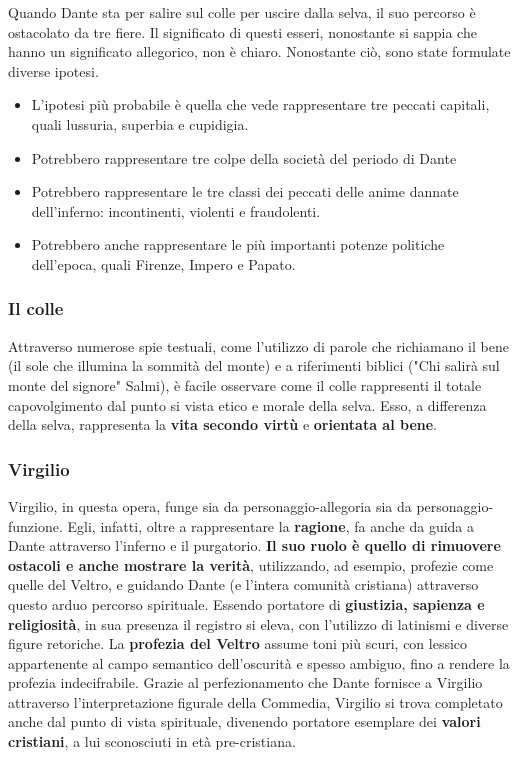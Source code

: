 \documentclass[10pt,a4paper]{article}
\begin{document}
 		Quando Dante sta per salire sul colle per uscire dalla selva, il suo percorso è ostacolato da tre fiere. Il significato di questi esseri, nonostante si sappia che hanno un significato allegorico, non è chiaro. Nonostante ciò, sono state formulate diverse ipotesi. 
 		\begin{itemize}
 			\item L'ipotesi più probabile è quella che vede rappresentare tre peccati capitali, quali lussuria, superbia e cupidigia.
 			\item Potrebbero rappresentare tre colpe della società del periodo di Dante
 			\item Potrebbero rappresentare le tre classi dei peccati delle anime dannate dell'inferno: incontinenti, violenti e fraudolenti.
 			\item Potrebbero anche rappresentare le più importanti potenze politiche dell'epoca, quali Firenze, Impero e Papato.  
 		\end{itemize}
 	
 		\subsubsection{Il colle}
 		
 		Attraverso numerose spie testuali, come l'utilizzo di parole che richiamano il bene (il sole che illumina la sommità del monte) e a riferimenti biblici ("Chi salirà sul monte del signore" Salmi), è facile osservare come il colle rappresenti il totale capovolgimento dal punto si vista etico e morale della selva. Esso, a differenza della selva, rappresenta la \textbf{vita secondo virtù} e \textbf{orientata al bene}.
 		
 		\subsubsection{Virgilio}
 		
		Virgilio, in questa opera, funge sia da personaggio-allegoria sia da personaggio-funzione. Egli, infatti, oltre a rappresentare la \textbf{ragione}, fa anche da guida a Dante attraverso l'inferno e il purgatorio. \textbf{Il suo ruolo è quello di rimuovere ostacoli e anche mostrare la verità}, utilizzando, ad esempio, profezie come quelle del Veltro, e guidando Dante (e l'intera comunità cristiana) attraverso questo arduo percorso spirituale. Essendo portatore di \textbf{giustizia, sapienza e religiosità}, in sua presenza il registro si eleva, con l'utilizzo di latinismi e diverse figure retoriche. La \textbf{profezia del Veltro} assume toni più scuri, con lessico appartenente al campo semantico dell'oscurità e spesso ambiguo, fino a rendere la profezia indecifrabile. Grazie al perfezionamento che Dante fornisce a Virgilio attraverso l'interpretazione figurale della Commedia, Virgilio si trova completato anche dal punto di vista spirituale, divenendo portatore esemplare dei \textbf{valori cristiani}, a lui sconosciuti in età pre-cristiana.
		
\end{document}
